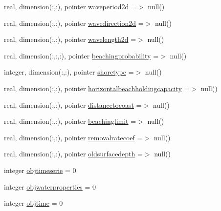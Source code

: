 \begin{DoxyCompactItemize}
\item 
real, dimension(\+:,\+:), pointer \mbox{\hyperlink{structmodulelagrangianglobal_1_1t__eulermodel_a3ee802e2f289780ea76babc440ce716e}{waveperiod2d}} =$>$ null()
\item 
real, dimension(\+:,\+:), pointer \mbox{\hyperlink{structmodulelagrangianglobal_1_1t__eulermodel_aa5b25ecce144c99c6529a7b555f6df1a}{wavedirection2d}} =$>$ null()
\item 
real, dimension(\+:,\+:), pointer \mbox{\hyperlink{structmodulelagrangianglobal_1_1t__eulermodel_a6cdd3468fb12ea01419f51e101a8ed86}{wavelength2d}} =$>$ null()
\item 
real, dimension(\+:,\+:,\+:), pointer \mbox{\hyperlink{structmodulelagrangianglobal_1_1t__eulermodel_af7426c7b804bbaae308b991a014b4bc9}{beachingprobability}} =$>$ null()
\item 
integer, dimension(\+:,\+:), pointer \mbox{\hyperlink{structmodulelagrangianglobal_1_1t__eulermodel_aa4dc1f85808b1407eb0a1a2bc2be769a}{shoretype}} =$>$ null()
\item 
real, dimension(\+:,\+:), pointer \mbox{\hyperlink{structmodulelagrangianglobal_1_1t__eulermodel_a4aa312656ed08ccb621369fdc2e0d2a9}{horizontalbeachholdingcapacity}} =$>$ null()
\item 
real, dimension(\+:,\+:), pointer \mbox{\hyperlink{structmodulelagrangianglobal_1_1t__eulermodel_a35cd55991e8c1d259a6a57fcecda6192}{distancetocoast}} =$>$ null()
\item 
real, dimension(\+:,\+:), pointer \mbox{\hyperlink{structmodulelagrangianglobal_1_1t__eulermodel_a05ec9b1605c1fdb8e82b2017aa4fc319}{beachinglimit}} =$>$ null()
\item 
real, dimension(\+:,\+:), pointer \mbox{\hyperlink{structmodulelagrangianglobal_1_1t__eulermodel_af461b7e3cca8717369becb9ace193f79}{removalratecoef}} =$>$ null()
\item 
real, dimension(\+:,\+:), pointer \mbox{\hyperlink{structmodulelagrangianglobal_1_1t__eulermodel_aaa2469949d6cea5c962bb16afdd0939a}{oldsurfacedepth}} =$>$ null()
\item 
integer \mbox{\hyperlink{structmodulelagrangianglobal_1_1t__eulermodel_aa8684ccdb936d58d3259ecb31fe0a9d6}{objtimeserie}} = 0
\item 
integer \mbox{\hyperlink{structmodulelagrangianglobal_1_1t__eulermodel_af0e45c4f84fde15e63263bc25f0087be}{objwaterproperties}} = 0
\item 
integer \mbox{\hyperlink{structmodulelagrangianglobal_1_1t__eulermodel_a4a72c7308afea464dde2fcc35b9c42af}{objtime}} = 0

\end{DoxyCompactItemize}
